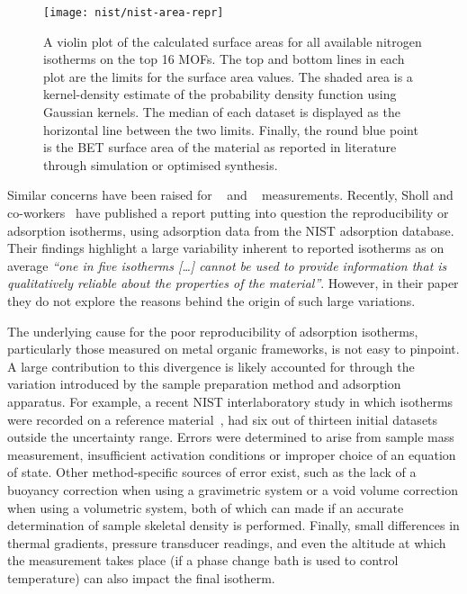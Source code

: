 \begin{figure}[tb]
    \centering
    \texttt{[image: nist/nist-area-repr]}%
    \caption{A violin plot of the calculated surface areas for 
    all available nitrogen isotherms on the top 16 MOFs. 
    The top and bottom lines in each plot are the limits for 
    the surface area values. The shaded area is a kernel-density estimate
    of the probability density function using Gaussian kernels.
    The median of each dataset is displayed as the horizontal line
    between the two limits. Finally, the round blue point is the 
    BET surface area of the material as reported in literature through
    simulation or optimised synthesis.}%
    \label{pyg:fgr:nist-area-repr}
\end{figure}

Similar concerns have been
raised for ~\cite{broomIrreproducibilityHydrogenStorage2016}
and ~\cite{espinalMeasurementStandardsData2013} measurements.
Recently, Sholl and co-workers~\cite{parkHowReproducibleAre2017}
have published a report putting into question the reproducibility
or adsorption isotherms, using  adsorption data from the 
NIST adsorption database. Their findings highlight a large
variability inherent
to reported isotherms as on average \textit{``one in five  
isotherms [\ldots] cannot be used to provide information that 
is qualitatively reliable about the properties of the material''}.
However, in their paper they do not explore the reasons behind the
origin of such large variations.

The underlying cause for the poor reproducibility of adsorption
isotherms, particularly those measured on metal organic frameworks,
is not easy to pinpoint. A large contribution to this divergence
is likely accounted for through the variation introduced by the
sample preparation method and adsorption apparatus.
For example, a recent NIST interlaboratory study in which  
isotherms were recorded on a reference 
material~\cite{nguyenReferenceHighpressureCO22018}, had six 
out of thirteen initial datasets outside the uncertainty range.
Errors were determined to arise from sample mass measurement,
insufficient activation conditions or improper choice of an 
equation of state. Other method-specific sources of error exist,
such as the lack of a buoyancy correction when using a 
gravimetric system or a void volume correction when using 
a volumetric system, both of which can made if an accurate
determination of sample skeletal density is performed. Finally,
small differences in thermal gradients, pressure transducer
readings, and even the altitude at which the measurement takes place
(if a phase change bath is used to control temperature)
can also impact the final isotherm.


